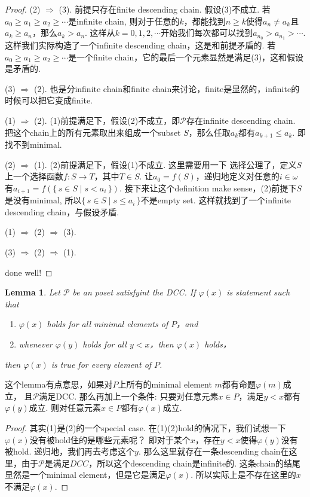 \documentclass{article}
\newtheorem{lemma}[theorem]{Lemma}
\newcommand*{\xfunc}[4]{{#2}\colon{#3}{#1}{#4}}
\newcommand*{\func}[3]{\xfunc{\to}{#1}{#2}{#3}}
\newcommand\Set[2]{\{\,#1\mid#2\,\}} %
\begin{document}
\begin{proof}
(2) $\Rightarrow$ (3). 前提只存在finite descending chain. 假设(3)不成立. 若$a_0 \geq a_1 \geq a_2 \geq \cdots$是infinite chain, 则对于任意的$k$，都能找到$n \geq k$使得$a_n \neq a_k$且$a_k \geq a_n$，那么$a_k > a_n$. 这样从$k=0,1,2,\cdots$开始我们每次都可以找到$a_{n_0} > a_{n_1} > \cdots$. 这样我们实际构造了一个infinite descending chain，这是和前提矛盾的. 若$a_0 \geq a_1 \geq a_2 \geq \cdots$是一个finite chain，它的最后一个元素显然是满足(3)，这和假设是矛盾的. 

(3) $\Rightarrow$ (2). 也是分infinite chain和finite chain来讨论，finite是显然的，infinite的时候可以把它变成finite.

(1) $\Rightarrow$ (2). (1)前提满足下，假设(2)不成立，即$\mathcal{P}$存在infinite descending chain. 把这个chain上的所有元素取出来组成一个subset $S$，那么任取$a_k$都有$a_{k+1} \leq a_k$. 即找不到minimal.

(2) $\Rightarrow$ (1). (2)前提满足下，假设(1)不成立.  这里需要用一下{\color{blue} 选择公理}了，定义$S$上一个选择函数$\func{f}{S}{T}$，其中$T \in S$. 让$a_0 = f(S)$，递归地定义对任意的$i \in \omega$有$a_{i+1} = f(\Set{s \in S}{s < a_i})$. 接下来让这个definition make sense，(2)前提下$S$是没有minimal, 所以$\Set{s \in S}{s \leq a_i}$不是empty set. 这样就找到了一个infinite descending chain，与假设矛盾.

(1) $\Rightarrow$ (2) $\Rightarrow$ (3).

(3) $\Rightarrow$ (2) $\Rightarrow$ (1).

{\color{blue} done well}!
\end{proof}

\begin{lemma}
\rm Let $\mathcal{P}$ be an poset satisfyint the DCC. If $\varphi(x)$ is statement such that
\begin{enumerate}
	\item $\varphi(x)$ holds for all minimal elements of $P$，and
	\item whenever $\varphi(y)$ holds for all $y < x$，then $\varphi(x)$ holds，
\end{enumerate}
then $\varphi(x)$ is true for every element of $P$.
\end{lemma}

{\color{blue} 这个lemma有点意思，如果对$P$上所有的minimal element $m$都有命题$\varphi(m)$成立， 且$\mathcal{P}$满足DCC. 那么再加上一个条件: 只要对任意元素$x \in P$，满足$y < x$都有$\varphi(y)$成立. 则对任意元素$x \in P$都有$\varphi(x)$成立}.

\begin{proof}
其实(1)是(2)的一个special case. 在(1)(2)hold的情况下，我们试想一下$\varphi(x)$没有被hold住的是哪些元素呢？ 即对于某个$x$，存在$y < x$使得$\varphi(y)$没有被hold. 递归地，我们再去考虑这个$y$. 那么这里就存在一条descending chain在这里，由于$\mathcal{P}$是满足$DCC$，所以这个descending chain是infinite的. 这条chain的结尾显然是一个minimal element，但是它是满足$\varphi(x)$. 所以实际上是不存在这里的$x$不满足$\varphi(x)$. 
\end{proof}
\end{document}
